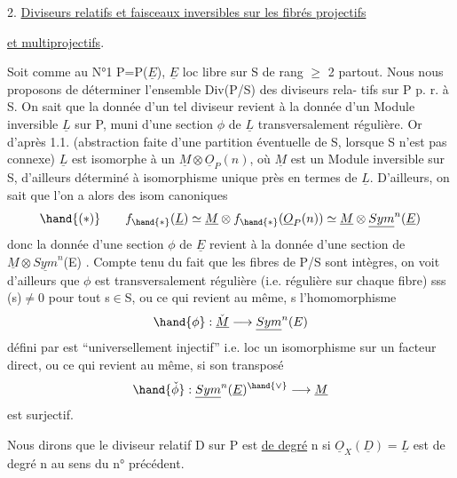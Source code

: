 
2. \uline{Diviseurs relatifs et faisceaux inversibles sur les fibrés projectifs}

\uline{et multiprojectifs}.

 Soit comme au N°1 P=P($\underline{E}$), $\underline{E}$ loc libre sur S de rang $\geqslant$ 2 partout.
Nous nous proposons de déterminer l'ensemble Div(P/S) des diviseurs rela-%
tifs  sur P p. r. à S. On sait que la donnée d'un tel diviseur revient à la
donnée d'un Module inversible $\underline{L}$ sur P, muni d'une section $\phi$ de $\underline{L}$
transversalement régulière. Or d'après 1.1. (abstraction faite d'une
partition éventuelle de S, lorsque S n'est pas connexe) $\underline{L}$ est isomorphe
à un $\underline{M}\otimes\underline{O}_P(n)$, où $\underline{M}$ est un Module inversible sur S, d'ailleurs déterminé
à isomorphisme unique près en termes de $\underline{L}$. D'ailleurs, on sait que
l'on a alors des isom canoniques
\[ \hand{(*)} \qquad f_{\hand{*}}(\underline{L}) \simeq \underline{M}\otimes f_{\hand{*}}(\underline{O}_P(n)) \simeq \underline{M}\otimes\underline{Sym}^n(\underline{E}) \]
donc la donnée d'une section  $\phi$ de $\underline{E}$ revient à la donnée d'une section
 de $\underline{M}\otimes\underline{Sym}^n$(E) . Compte tenu du fait que les fibres de P/S sont intègres,
on voit d'ailleurs que $\phi$ est transversalement régulière (i.e. régulière
sur chaque fibre) sss \hand{$\phi$}(s)$\neq$0 pour tout s$\in$S, ou ce qui revient au même,
s l'homomorphisme
\[ \hand{\phi} : \check{\underline{M}} \longrightarrow \underline{Sym}^n(E) \]
défini par \hand{$\phi$} est ``universellement injectif'' i.e. loc un isomorphisme sur
un facteur direct, ou ce qui revient au même, si son transposé
\[ \hand{\check{\phi}} : \underline{Sym}^n(\underline{E})^{\hand{\vee}} \longrightarrow \underline{M} \]
est surjectif.

Nous dirons que le diviseur relatif D sur P est \uline{de degré} n
si $\underline{O}_X(\underline{D})= \underline{L}$ est de degré n au sens du n° précédent. 

